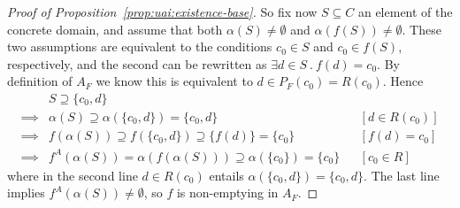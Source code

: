 \begin{proof}[Proof of Proposition~\ref{prop:uai:existence-base}]
	So fix now $S \subseteq C$ an element of the concrete domain, and assume that both $\alpha(S) \neq \emptyset$ and $\alpha(f(S)) \neq \emptyset$.
	These two assumptions are equivalent to the conditions $c_0 \in S$ and $c_0 \in f(S)$, respectively, and the second can be rewritten as $\exists d \in S\ .\ f(d) = c_0$. By definition of $A_F$ we know this is equivalent to $d \in P_F(c_0) = R(c_0)$.
	Hence
	\begin{align*}
		         & S \supseteq \{ c_0, d \}                                                        &  &                \\
		\implies & \alpha(S) \supseteq \alpha(\{ c_0, d \}) = \{ c_0, d \}                         &  & [d \in R(c_0)] \\
		\implies & f(\alpha(S)) \supseteq f(\{ c_0, d \}) \supseteq \{ f(d) \} = \{ c_0 \}         &  & [f(d) = c_0]   \\
		\implies & f^{A}(\alpha(S)) = \alpha(f(\alpha(S))) \supseteq \alpha(\{ c_0 \}) = \{ c_0 \} &  & [c_0 \in R]
	\end{align*}
	where in the second line $d \in R(c_0)$ entails $\alpha(\{ c_0, d \}) = \{ c_0, d \}$.
	The last line implies $f^{A}(\alpha(S)) \neq \emptyset$, so $f$ is non-emptying in $A_F$.
\end{proof}

